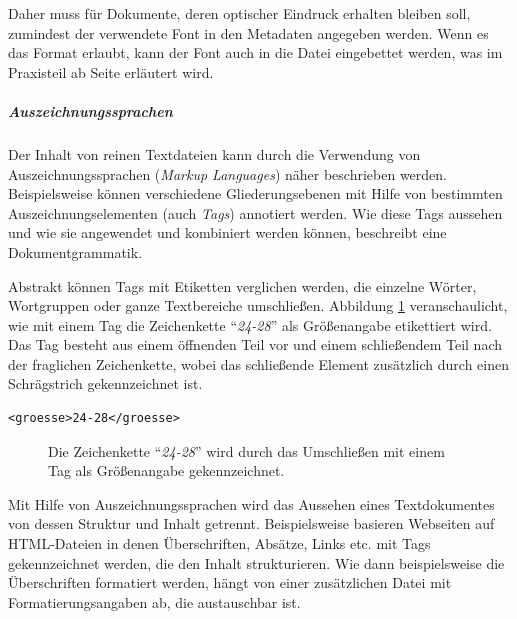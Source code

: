 Daher muss für Dokumente, deren optischer Eindruck erhalten bleiben soll, zumindest der verwendete Font in den Metadaten angegeben werden. Wenn es das Format erlaubt, kann der Font auch in die Datei eingebettet werden, was im Praxisteil ab Seite \pageref{text-fontembedding} erläutert wird.


\subparagraph{Auszeichnungssprachen}\label{text-auszeichnungssprachen}
Der Inhalt von reinen Textdateien kann durch die Verwendung von Auszeichnungssprachen (\emph{Markup Languages}) näher beschrieben werden. Beispielsweise können verschiedene Gliederungsebenen mit Hilfe von bestimmten Auszeichnungselementen (auch \emph{Tags}) annotiert werden. Wie diese Tags aussehen und wie sie angewendet und kombiniert werden können, beschreibt eine Dokumentgrammatik. 

Abstrakt können Tags mit Etiketten verglichen werden, die einzelne Wörter, Wortgruppen oder ganze Textbereiche umschließen. Abbildung \ref{abb:Text-Tag} veranschaulicht, wie mit einem Tag die Zeichenkette "`\emph{24-28}"' als Größenangabe etikettiert wird. Das Tag besteht aus einem öffnenden Teil vor und einem schließendem Teil nach der fraglichen Zeichenkette, wobei das schließende Element zusätzlich durch einen Schrägstrich gekennzeichnet ist.

\newsavebox{\singleTag}
\begin{lrbox}{\singleTag}
\lstset{language=XML}
\begin{lstlisting}[mathescape]
<groesse>24-28</groesse>
\end{lstlisting}
\end{lrbox}

\begin{figure}
	\usebox{\singleTag}
	\caption{Die Zeichenkette "`\emph{24-28}"' wird durch das Umschließen mit einem Tag als Größenangabe gekennzeichnet.}
\label{abb:Text-Tag}
\end{figure}

Mit Hilfe von Auszeichnungssprachen wird das Aussehen eines Textdokumentes von dessen Struktur und Inhalt getrennt. Beispielsweise basieren Webseiten auf HTML-Dateien in denen Überschriften, Absätze, Links etc. mit Tags gekennzeichnet werden, die den Inhalt strukturieren. Wie dann beispielsweise die Überschriften formatiert werden, hängt von einer zusätzlichen Datei mit Formatierungsangaben ab, die austauschbar ist.

